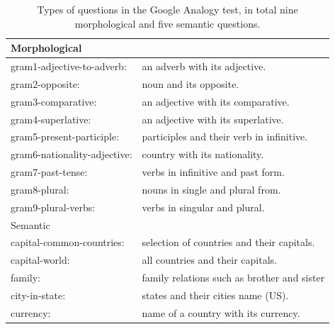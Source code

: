 \begin{table}[h]
\centering

\begin{tabular}{ll}
        \toprule
{Morphological} & \\         \midrule

gram1-adjective-to-adverb:& an adverb with its adjective.            \\ \hline
gram2-opposite: &noun and its opposite.                          \\ \hline
gram3-comparative: & an adjective with its comparative.                                           \\ \hline
gram4-superlative:&an adjective with its superlative.                                                    \\ \hline
gram5-present-participle:&participles and their verb in infinitive.                                           \\ \hline
gram6-nationality-adjective:&country with its nationality.                                                                \\ \hline
gram7-past-tense: &verbs in infinitive and past form.                                                             \\ \hline
gram8-plural:& nouns in single and plural from.                                                         \\ \hline
gram9-plural-verbs: &verbs in singular and plural.                                                          \\ 
\midrule
\midrule
{Semantic}&\\   
\midrule

capital-common-countries:                 &           selection of countries and their capitals.\\ \hline
capital-world:          &        all countries and their capitals.    \\ \hline
family:     &             family relations such as brother and sister  \\ \hline
city-in-state:   &      states and their cities name (US). \\ \hline
currency:    &        name of a country with its currency.  \\
\bottomrule
\end{tabular}
 \caption{Types of questions in the Google Analogy test, in total nine
  morphological and five semantic questions.} 
  \label{table:analogy_types}
\end{table}

